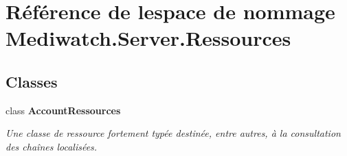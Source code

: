 \hypertarget{namespace_mediwatch_1_1_server_1_1_ressources}{}\section{Référence de l\textquotesingle{}espace de nommage Mediwatch.\+Server.\+Ressources}
\label{namespace_mediwatch_1_1_server_1_1_ressources}
\subsection*{Classes}
\begin{DoxyCompactItemize}
\item 
class {\bfseries Account\+Ressources}
\begin{DoxyCompactList}\small\item\em Une classe de ressource fortement typée destinée, entre autres, à la consultation des chaînes localisées. \end{DoxyCompactList}\end{DoxyCompactItemize}

